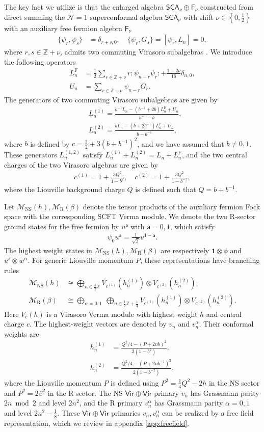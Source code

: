 \documentclass[aps,10pt,twocolumn,superscriptaddress]{revtex4-2}
\def\ie{\begin{equation}\begin{aligned}}
\def\fe{\end{aligned}\end{equation}}
\def\NS{\mathrm{NS}}
\def\R{\mathrm{R}}
\begin{document}
The key fact we utilize is that the enlarged algebra $\mathsf{SCA}_\nu \oplus \mathsf{F}_{\nu}$ constructed from direct summing the $\mathcal{N}=1$ superconformal algebra $\mathsf{SCA}_\nu$ with shift $\nu\in \left\{0,\frac{1}{2}\right\}$ with an auxiliary free fermion algebra $\mathsf{F}_\nu$
\ie
\{\psi_r, \psi_s\} &= \delta_{r+s,0},\quad \{\psi_r, G_s\}=[\psi_r, L_n] = 0,
\fe
where $r, s\in \mathbb{Z}+\nu$, admits two commuting Virasoro subalgebras \cite{Hadasz:2013dza,Bershtein:2014yia,Bershtein:2016uov}. We introduce the following operators
\ie
L_n^{\mathrm{F}} &= \frac{1}{2} \sum_{r\in \mathbb{Z}+\nu} r:\psi_{n-r}\psi_r: + \frac{1-2\nu}{16}\delta_{n,0},\\
U_n &= \sum_{r\in \mathbb{Z}+\nu} \psi_{n-r} G_r.
\fe
The generators of two commuting Virasoro subalgebras are given by
\ie
& L_n^{(1)}=\frac{b^{-1} L_n-\left(b^{-1}+2 b\right) L_n^{\mathrm{F}}+U_n}{b^{-1}-b}, \\
& L_n^{(2)}=\frac{b L_n-\left(b+2 b^{-1}\right) L_n^{\mathrm{F}}+U_n}{b-b^{-1}},
\fe
where $b$ is defined by $c= \frac{3}{2}+3\left(b+b^{-1}\right)^2$, and we have assumed that $b\neq 0,1$. These generators $L_n^{(1,2)}$ satisfy $L_n^{(1)}+L_n^{(2)}=L_n+L_n^{\mathrm{F}}$, and the two central charges of the two Virasoro algebras are given by
\ie
c^{(1)}=1+\frac{3 Q^2}{1-b^2}, \quad c^{(2)}=1+\frac{3 Q^2}{1-b^{-2}},
\fe
where the Liouville background charge $Q$ is defined such that $Q=b+b^{-1}$.

Let $\mathcal{M}_{\NS}(h), \mathcal{M}_{\R}(\beta)$ denote the tensor products of the auxiliary fermion Fock space with the corresponding SCFT Verma module. We denote the two R-sector ground states for the free fermion by $u^\mathsf{a}$ with $\mathsf{a}=0,1$, which satisfy
\ie
\psi_0 u^{\mathsf{a}} = \frac{1}{\sqrt{2}} u^{1-\mathsf{a}}.
\fe
The highest weight states in $\mathcal{M}_{\NS}(h), \mathcal{M}_{\R}(\beta)$ are respectively $\mathbf{1}\otimes \phi$ and $u^{\mathsf{a}}\otimes w^\alpha$. For generic Liouville momentum $P$, these representations have branching rules \cite{Bershtein:2014yia,Bershtein:2016uov}
\ie
\mathcal{M}_{\NS}(h)&\cong\bigoplus_{n\in\frac12\mathbb Z} V_{c^{(1)}}(h_n^{(1)})\otimes V_{c^{(2)}}(h_n^{(2)}),\\
\mathcal{M}_{\R}(\beta)&\cong\bigoplus_{\alpha=0,1}\ \bigoplus_{n\in\frac12\mathbb Z+\frac14} V_{c^{(1)}}(h_n^{(1)})\otimes V_{c^{(2)}}(h_n^{(2)}).
\fe
Here $V_c(h)$ is a Virasoro Verma module with highest weight $h$ and central charge $c$. The highest-weight vectors are denoted by $v_n$ and $v_n^\alpha$. Their conformal weights are
\ie
h_n^{(1)}&=\frac{Q^2/4-(P+2nb)^2}{2(1-b^2)},\\
h_n^{(2)}&=\frac{Q^2/4-(P+2nb^{-1})^2}{2(1-b^{-2})},
\fe
where the Liouville momentum $P$ is defined using $P^2=\frac{1}{4}Q^2-2h$ in the NS sector and $P^2=2\beta^2$ in the R sector. The NS $\mathsf{Vir}\oplus \mathsf{Vir}$ primary $v_n$ has Grassmann parity $2n\bmod2$ and level $2n^2$, and the R primary $v^\alpha_n$ has Grassmann parity $\alpha=0,1$ and level $2n^2-\frac18$. These $\mathsf{Vir\oplus Vir}$ primaries $v_n, v_n^\alpha$ can be realized by a free field representation, which we review in appendix \ref{app:freefield}.
\end{document}
